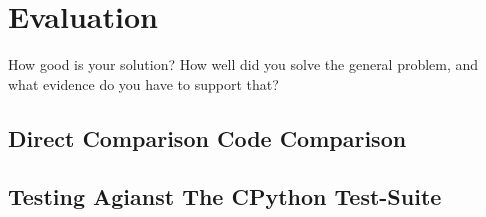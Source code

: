 \documentclass{l4proj}
\begin{document}





\chapter{Evaluation} 
How good is your solution? How well did you solve the general problem, and what evidence do you have to support that?

\section{Direct Comparison Code Comparison}

\section{Testing Agianst The CPython Test-Suite}
\end{document}
